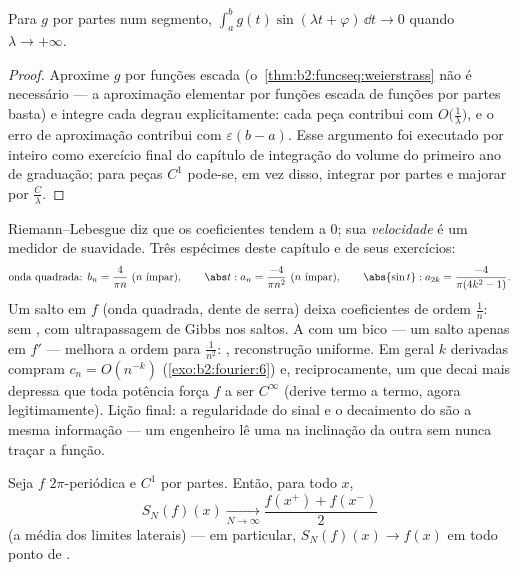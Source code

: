 \begin{theorem}\label{thm:b2:fourier:riemannlebesgue}
Para $g$  por partes num segmento,
$\int_a^b g(t)\sin(\lambda t + \varphi)\,\dd t \to 0$ quando $\lambda
\to +\infty$.
\end{theorem}

\begin{proof}
Aproxime $g$  por funções escada
(o~\cref{thm:b2:funcseq:weierstrass} não é necessário --- a aproximação
elementar por funções escada de funções  por partes
basta) e integre cada degrau explicitamente: cada peça
contribui com $O\bigl(\frac1\lambda\bigr)$, e o erro de aproximação
contribui com $\varepsilon(b - a)$. Esse argumento foi executado
por inteiro como exercício final do capítulo de integração do
volume do primeiro ano de graduação; para peças $C^1$ pode-se, em vez disso, integrar por
partes e majorar por $\frac C\lambda$.
\end{proof}

\begin{example}\label{ex:b2:fourier:decaytable}
Riemann--Lebesgue diz que os coeficientes tendem a $0$; sua
\emph{velocidade} é um medidor de suavidade. Três espécimes deste
capítulo e de seus exercícios:
\[
\text{onda quadrada: } b_n = \frac{4}{\pi n}\ (n\ \text{ímpar}),
\qquad
\abs t : a_n = \frac{-4}{\pi n^2}\ (n\ \text{ímpar}),
\qquad
\abs{\sin t} : a_{2k} = \frac{-4}{\pi(4k^2-1)} .
\]
Um salto em $f$ (onda quadrada, dente de serra) deixa coeficientes de
ordem $\frac1n$: sem , com ultrapassagem de Gibbs nos
saltos. A  com um bico --- um salto apenas em $f'$ ---
melhora a ordem para $\frac{1}{n^2}$: ,
reconstrução uniforme. Em geral $k$ derivadas compram $c_n =
O(n^{-k})$ (\cref{exo:b2:fourier:6}) e, reciprocamente, um 
que decai mais depressa que toda potência força $f$ a ser $C^\infty$
(derive termo a termo, agora legitimamente). Lição
final: a regularidade do sinal e o decaimento do 
são a mesma informação --- um engenheiro lê uma na
inclinação da outra sem nunca traçar a função.
\end{example}

\begin{theorem}[Dirichlet]\label{thm:b2:fourier:dirichlet}
Seja $f$ $2\pi$-periódica e $C^1$ por partes. Então, para todo $x$,
\[
S_N(f)(x) \xrightarrow[N \to \infty]{}
\frac{f(x^+) + f(x^-)}{2}
\]
(a média dos limites laterais) --- em particular, $S_N(f)(x) \to
f(x)$ em todo ponto de .
\end{theorem}


